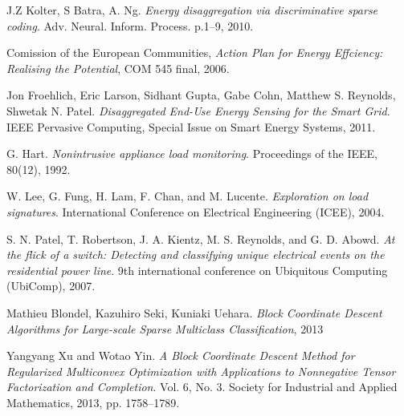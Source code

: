 \begin{thebibliography}{9}



  J.Z Kolter, S Batra, A. Ng. \emph{Energy disaggregation via discriminative sparse coding}.
  Adv. Neural. Inform. Process. p.1–9, 2010.

Comission of the European Communities, \emph{Action Plan for Energy Effciency: Realising the Potential}, COM 545 final, 2006.

Jon Froehlich, Eric Larson, Sidhant Gupta, Gabe Cohn, Matthew S. Reynolds, Shwetak N. Patel. \emph{Disaggregated End-Use Energy Sensing for the Smart Grid}. 
IEEE Pervasive Computing, Special Issue on Smart Energy Systems, 2011.

G. Hart. \emph{Nonintrusive appliance load monitoring}. 
Proceedings of the IEEE, 80(12), 1992.

W. Lee, G. Fung, H. Lam, F. Chan, and M. Lucente. \emph{Exploration on load signatures}. 
International Conference on Electrical Engineering (ICEE), 2004.

S. N. Patel, T. Robertson, J. A. Kientz, M. S. Reynolds, and G. D. Abowd. \emph{At the flick of a switch: Detecting and classifying unique electrical events on the residential power line}. 
9th international conference on Ubiquitous Computing (UbiComp), 2007.

Mathieu Blondel, Kazuhiro Seki, Kuniaki Uehara. \emph{Block Coordinate Descent Algorithms for Large-scale Sparse Multiclass Classification}, 2013

Yangyang Xu and Wotao Yin. \emph{A Block Coordinate Descent Method for Regularized Multiconvex Optimization with Applications to Nonnegative Tensor Factorization and Completion}. 
Vol. 6, No. 3.  Society for Industrial and Applied Mathematics, 2013, pp. 1758–1789.


\end{thebibliography}
